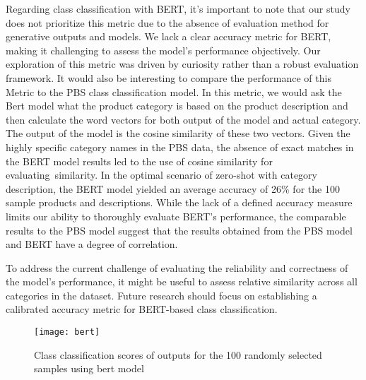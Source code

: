 Regarding class classification with BERT, it's important to note that our study does not prioritize this metric due to the absence of evaluation method for generative outputs and models. We lack a clear accuracy metric for BERT, making it challenging to assess the model's performance objectively. Our exploration of this metric was driven by curiosity rather than a robust evaluation framework. It would also be interesting to compare the performance of this Metric to the PBS class classification model. In this metric, we would ask the Bert model what the product category is based on the product description and then calculate the word vectors for both output of the model and actual category. The output of the model is the cosine similarity of these two vectors. Given the highly specific category names in the PBS data, the absence of exact matches in the BERT model results led to the use of cosine similarity for evaluating similarity. In the optimal scenario of zero-shot with category description, the BERT model yielded an average accuracy of 26\% for the 100 sample products and descriptions. While the lack of a defined accuracy measure limits our ability to thoroughly evaluate BERT's performance, the comparable results to the PBS model suggest that the results obtained from the PBS model and BERT have a degree of correlation.

 To address the current challenge of evaluating the reliability and correctness of the model's performance, it might be useful to assess relative similarity across all categories in the dataset. Future research should focus on establishing a calibrated accuracy metric for BERT-based class classification. 

\begin{figure}[H]
	\centering
	\texttt{[image: bert]}
	\caption{Class classification scores of outputs for the 100 randomly selected samples using bert model}
	\label{fig:results-bert}
\end{figure}